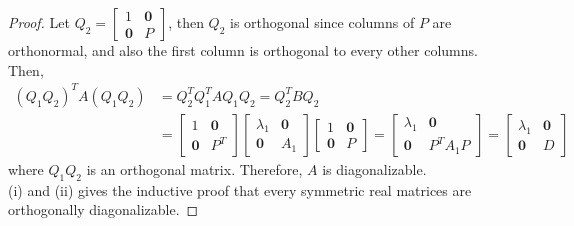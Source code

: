 \begin{proof}
	Let $Q_2 = \begin{bmatrix}
		1 & \textbf{0} \\ \textbf{0} & P
	\end{bmatrix}$, then $Q_2$ is orthogonal since columns of $P$ are orthonormal, and also the first column is orthogonal to every other columns. Then, \begin{align*}
		(Q_1Q_2)^TA(Q_1Q_2) &= Q_2^TQ_1^TAQ_1Q_2 = Q_2^TBQ_2 \\
		&= \begin{bmatrix}
			1 & \textbf{0} \\ \textbf{0} & P^T
		\end{bmatrix}\begin{bmatrix}
			\lambda_1 & \textbf{0} \\ \textbf{0} & A_1
		\end{bmatrix}\begin{bmatrix}
			1 & \textbf{0} \\ \textbf{0} & P
		\end{bmatrix} = \begin{bmatrix}
			\lambda_1 & \textbf{0} \\ \textbf{0} & P^TA_1P
		\end{bmatrix} = \begin{bmatrix}
			\lambda_1 & \textbf{0} \\ \textbf{0} & D
		\end{bmatrix}
	\end{align*} where $Q_1Q_2$ is an orthogonal matrix. Therefore, $A$ is diagonalizable. \\
	
	(i) and (ii) gives the inductive proof that every symmetric real matrices are orthogonally diagonalizable.
\end{proof}

